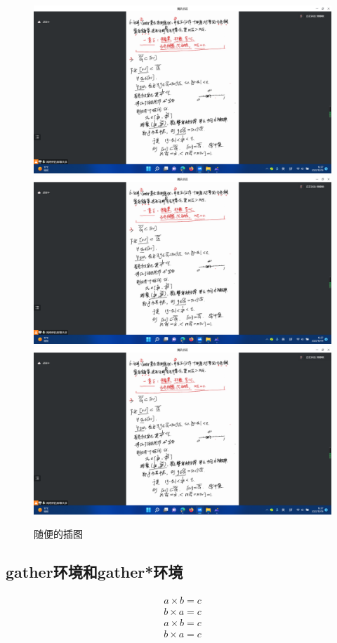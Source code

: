 \documentclass{article}
\begin{document}
	\begin{figure}[htbp]
		\centering
		\includegraphics[scale=0.08]{屏幕截图(196)}
		\qquad
		\includegraphics[scale=0.08]{屏幕截图(196)}
		\\[10pt]
		\includegraphics[scale=0.17]{屏幕截图(196)}
		\caption{随便的插图}
	\end{figure}
	

	
	\subsection{gather环境和gather*环境}
	\begin{gather}
		a \times b = c\\
		b \times a = c
	\end{gather}
	\begin{gather*}
		a \times b = c\\
		b \times a = c
	\end{gather*}
\end{document}
